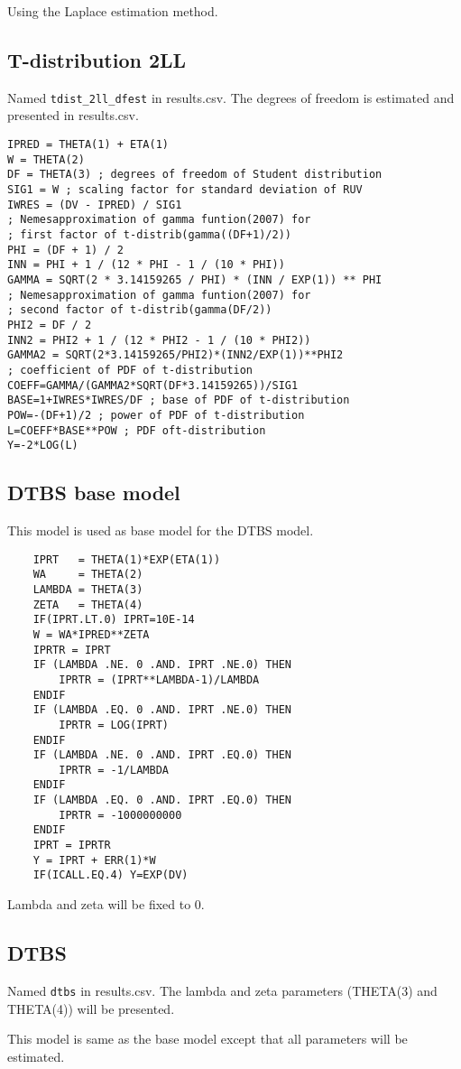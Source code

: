 Using the Laplace estimation method.

\subsection{T-distribution 2LL}
Named \verb|tdist_2ll_dfest| in results.csv. The degrees of freedom is estimated and presented in results.csv.

\begin{verbatim}
IPRED = THETA(1) + ETA(1)
W = THETA(2)
DF = THETA(3) ; degrees of freedom of Student distribution
SIG1 = W ; scaling factor for standard deviation of RUV
IWRES = (DV - IPRED) / SIG1
; Nemesapproximation of gamma funtion(2007) for
; first factor of t-distrib(gamma((DF+1)/2))
PHI = (DF + 1) / 2
INN = PHI + 1 / (12 * PHI - 1 / (10 * PHI))
GAMMA = SQRT(2 * 3.14159265 / PHI) * (INN / EXP(1)) ** PHI
; Nemesapproximation of gamma funtion(2007) for
; second factor of t-distrib(gamma(DF/2))
PHI2 = DF / 2
INN2 = PHI2 + 1 / (12 * PHI2 - 1 / (10 * PHI2))
GAMMA2 = SQRT(2*3.14159265/PHI2)*(INN2/EXP(1))**PHI2
; coefficient of PDF of t-distribution
COEFF=GAMMA/(GAMMA2*SQRT(DF*3.14159265))/SIG1
BASE=1+IWRES*IWRES/DF ; base of PDF of t-distribution
POW=-(DF+1)/2 ; power of PDF of t-distribution
L=COEFF*BASE**POW ; PDF oft-distribution
Y=-2*LOG(L)
\end{verbatim}

\subsection{DTBS base model}
This model is used as base model for the DTBS model.
\begin{verbatim}
    IPRT   = THETA(1)*EXP(ETA(1))
	WA     = THETA(2)
	LAMBDA = THETA(3)
	ZETA   = THETA(4)
	IF(IPRT.LT.0) IPRT=10E-14
	W = WA*IPRED**ZETA
	IPRTR = IPRT
	IF (LAMBDA .NE. 0 .AND. IPRT .NE.0) THEN
		IPRTR = (IPRT**LAMBDA-1)/LAMBDA
	ENDIF
	IF (LAMBDA .EQ. 0 .AND. IPRT .NE.0) THEN
		IPRTR = LOG(IPRT)
	ENDIF
	IF (LAMBDA .NE. 0 .AND. IPRT .EQ.0) THEN
		IPRTR = -1/LAMBDA
	ENDIF
	IF (LAMBDA .EQ. 0 .AND. IPRT .EQ.0) THEN
		IPRTR = -1000000000
	ENDIF
	IPRT = IPRTR
	Y = IPRT + ERR(1)*W
	IF(ICALL.EQ.4) Y=EXP(DV)
\end{verbatim}

Lambda and zeta will be fixed to 0.

\subsection{DTBS}
Named \verb|dtbs| in results.csv. The lambda and zeta parameters (THETA(3) and THETA(4)) will be presented.

This model is same as the base model except that all parameters will be estimated.


